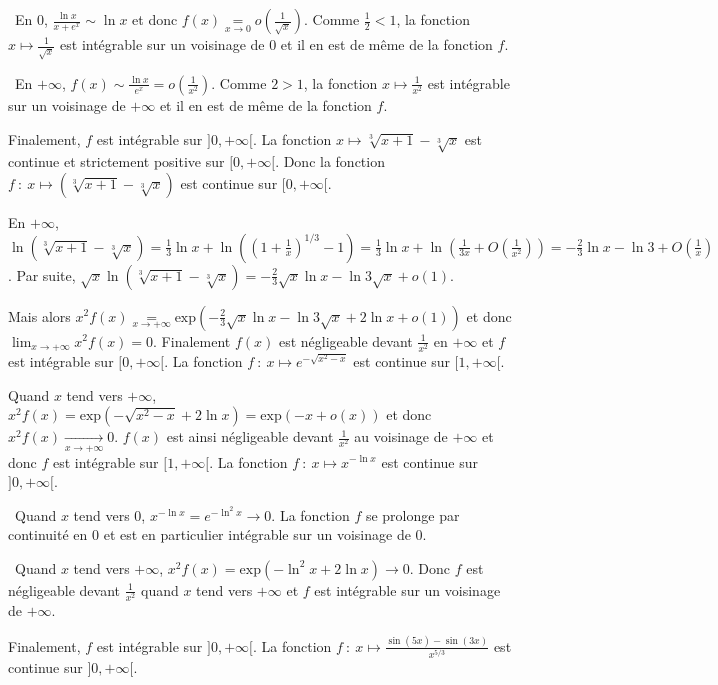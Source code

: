 {{\textbullet~En $0$, $\frac{\ln x}{x+e^x}\sim\ln x$ et donc $f(x)\underset{x\rightarrow0}{=}o\left(\frac{1}{\sqrt{x}}\right)$. Comme $\frac{1}{2}<1$, la fonction $x\mapsto\frac{1}{\sqrt{x}}$ est intégrable sur un voisinage de $0$ et il en est de même de la fonction $f$.

\textbullet~En $+\infty$,  $f(x)\sim\frac{\ln x}{e^x}=o\left(\frac{1}{x^2}\right)$. Comme $2>1$, la fonction $x\mapsto\frac{1}{x^2}$ est intégrable sur un voisinage de $+\infty$ et il en est de même de la fonction $f$. 

Finalement, $f$ est intégrable sur $]0,+\infty[$.
La fonction $x\mapsto\sqrt[3]{x+1}-\sqrt[3]{x}$ est continue et strictement positive sur $[0,+\infty[$. Donc la fonction $f~:~x\mapsto\left(\sqrt[3]{x+1}-\sqrt[3]{x}\right)$ est continue sur $[0,+\infty[$.

En $+\infty$, $\ln\left(\sqrt[3]{x+1}-\sqrt[3]{x}\right)=\frac{1}{3}\ln x+\ln\left(\left(1+\frac{1}{x}\right)^{1/3}-1\right)=\frac{1}{3}\ln x+\ln\left(\frac{1}{3x}+O\left(\frac{1}{x^2}\right)\right)= -\frac{2}{3}\ln x -\ln3 + O\left(\frac{1}{x}\right)$. Par suite, $\sqrt{x}\ln\left(\sqrt[3]{x+1}-\sqrt[3]{x}\right)=-\frac{2}{3}\sqrt{x}\ln x -\ln3\sqrt{x}+o(1)$.

Mais alors $x^2f(x)\underset{x\rightarrow+\infty}{=}\text{exp}\left(-\frac{2}{3}\sqrt{x}\ln x -\ln3\sqrt{x}+2\ln x+o(1)\right)$ et donc $\lim_{x \rightarrow +\infty}x^2f(x)=0$. Finalement $f(x)$ est négligeable devant $\frac{1}{x^2}$ en $+\infty$ et $f$ est intégrable sur $[0,+\infty[$.
La fonction $f~:~x\mapsto e^{-\sqrt{x^2-x}}$ est continue sur $[1,+\infty[$.

Quand $x$ tend vers $+\infty$, $x^2f(x)=\text{exp}\left(-\sqrt{x^2-x}+2\ln x\right)=\text{exp}(-x+o(x))$ et donc $x^2f(x)\underset{x\rightarrow+\infty}{\rightarrow}0$. $f(x)$ est ainsi négligeable devant $\frac{1}{x^2}$ au voisinage de $+\infty$ et donc $f$ est intégrable sur $[1,+\infty[$.
La fonction $f~:~x\mapsto x^{-\ln x}$ est continue sur $]0,+\infty[$.

\textbullet~Quand $x$ tend vers $0$, $x^{-\ln x}=e^{-\ln^2x}\rightarrow0$. La fonction $f$ se prolonge par continuité en $0$ et est en particulier intégrable sur un voisinage de $0$.

\textbullet~Quand $x$ tend vers $+\infty$, $x^2f(x)=\text{exp}\left(-\ln^2x+2\ln x\right)\rightarrow0$. Donc $f$ est négligeable devant  $\frac{1}{x^2}$ quand $x$ tend vers $+\infty$ et $f$ est intégrable sur un voisinage de $+\infty$.

Finalement, $f$ est intégrable sur $]0,+\infty[$.
La fonction $f~:~x\mapsto\frac{\sin(5x)-\sin(3x)}{x^{5/3}}$  est continue sur $]0,+\infty[$.

}}
